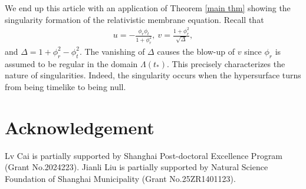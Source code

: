 \documentclass[10pt,leqno]{amsart}
\numberwithin{equation}{section}
\begin{document}
We end up this article with an application of Theorem \ref{main thm} showing the singularity formation of the relativistic membrane equation. Recall that 
\begin{equation}
	\begin{aligned}
		u=-\frac{\phi_{r}\phi_{t}}{1+\phi_{r}^{2}}, \ 
		v=\frac{1+\phi_{r}^{2}}{\sqrt{\Delta}},
	\end{aligned}
\end{equation}
and $ \Delta = 1+\phi_{r}^{2}-\phi_{t}^{2} $. The vanishing of $\Delta$ causes the blow-up of $v$ since $\phi_{r}$ is assumed to be regular in the domain $\Lambda(t_*)$. This
 precisely characterizes the nature of singularities. Indeed, the singularity occurs when the hypersurface turns from being timelike to being null. 

\section*{Acknowledgement}

Lv Cai is partially supported by Shanghai Post-doctoral Excellence Program (Grant No.2024223). Jianli Liu is partially supported by Natural Science Foundation of Shanghai Municipality (Grant No.25ZR1401123).




$\,$

$\,$
\end{document}
